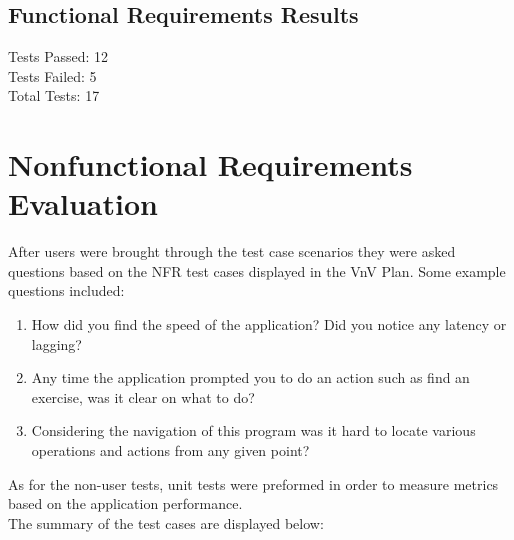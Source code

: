 \documentclass[12pt, titlepage]{article}
\begin{document}
\subsection{Functional Requirements Results}

Tests Passed: 12\\
Tests Failed: 5\\
Total Tests: 17\\

\section{Nonfunctional Requirements Evaluation}

\noindent After users were brought through the test case scenarios they were asked questions based on the NFR test cases displayed in the VnV Plan.
Some example questions included: \\
\begin{enumerate}
	\item How did you find the speed of the application? Did you notice any latency or lagging?
	\item Any time the application prompted you to do an action such as find an exercise, was it clear on what to do?
	\item Considering the navigation of this program was it hard to locate various operations and actions from any given point?
\end{enumerate}

\noindent As for the non-user tests, unit tests were preformed in order to measure metrics based on the application performance.\\

\noindent The summary of the test cases are displayed below:
\end{document}
